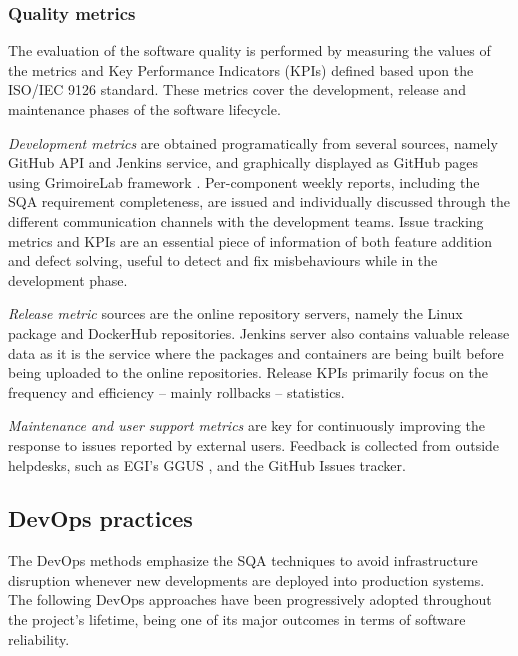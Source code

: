 \documentclass[journal]{IEEEtran}
\begin{document}
\subsubsection{Quality metrics}

The evaluation of the software quality is performed by measuring the values of
the metrics and Key Performance Indicators (KPIs) defined based upon the
ISO/IEC 9126 standard. These metrics cover the development, release and
maintenance phases of the software lifecycle.

\textit{Development metrics} are obtained programatically from several sources, namely GitHub
API and Jenkins service, and graphically displayed as GitHub pages using GrimoireLab
framework \cite{grimoirelab}. Per-component weekly reports, including the SQA requirement
completeness, are issued and individually discussed through the different communication channels
with the development teams. Issue tracking metrics and KPIs are an essential piece of information
of both feature addition and defect solving, useful to detect and fix misbehaviours while in the
development phase.

\textit{Release metric} sources are the online repository servers, namely the
Linux package \cite{indigo-pkg-repo} and DockerHub \cite{indigo-dockerhub} repositories. Jenkins
server also contains valuable release data as it is the service where the packages
and containers are being built before being uploaded to the online repositories. Release
KPIs primarily focus on the frequency and efficiency -- mainly rollbacks -- statistics.

\textit{Maintenance and user support metrics} are key for continuously improving the response
to issues reported by external users. Feedback is collected from outside helpdesks, such as
EGI's GGUS \cite{ggus}, and the GitHub Issues tracker.

\subsection{DevOps practices}
\label{sec:devops}

The DevOps methods emphasize the SQA techniques to avoid infrastructure
disruption whenever new developments are deployed into production systems. The
following DevOps approaches have been progressively adopted throughout the project's
lifetime, being one of its major outcomes in terms of software reliability.
\end{document}
